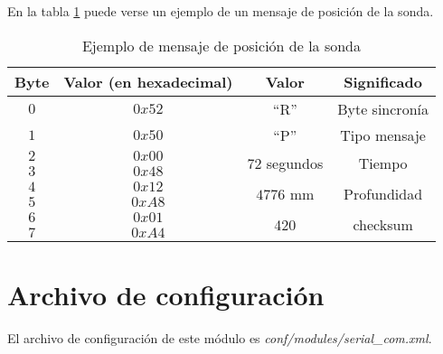 En la tabla \ref{tab15} puede verse un ejemplo de un mensaje de posición de la sonda.

\begin{table}[h]
	\centering
	\caption{Ejemplo de mensaje de posición de la sonda}
	\begin{tabular}{|c|c|c|c|}\hline
		\textbf{Byte} 	&	\textbf{Valor (en hexadecimal)}	&\textbf{Valor}	&\textbf{Significado} \\ \hline \hline
		$0$ 			&  $0x52$			& ``R''	& Byte sincronía	\\ \hline
		$1$				&  $0x50$			& ``P''		& Tipo mensaje		\\ \hline
		$2$				&  $0x00$			& \multirow{2}{*}{$72$ segundos} & \multirow{2}{*}{Tiempo} \\
		$3$				&  $0x48$			&  & \\ \hline	
		$4$				&  $0x12$			& \multirow{2}{*}{$4776$ mm} & \multirow{2}{*}{Profundidad} \\
		$5$				&  $0xA8$			&  & \\ \hline	
		$6$				&  $0x01$			&  \multirow{2}{*}{420}	& \multirow{2}{*}{checksum} \\
		$7$				&  $0xA4$			&     &     \\ \hline	
		
		
	\end{tabular}
	\label{tab15}
\end{table}


\section{Archivo de configuración}\label{sec:2}

El archivo de configuración de este módulo es \textit{conf/modules/serial\_com.xml}.

